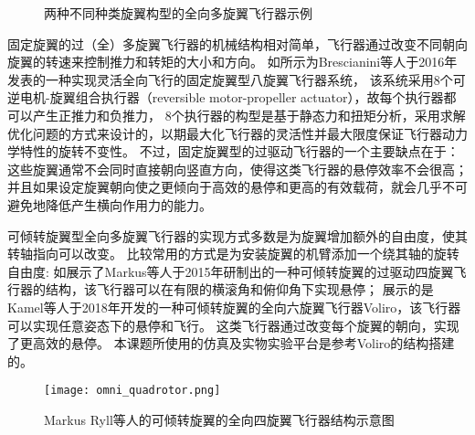 \begin{figure}[!ht]
    \setlength{\subfigcapskip}{-1bp}
    \centering
    \begin{minipage}{\textwidth}

    \centering
    \subfigure{\label{fig:omav_1}}\addtocounter{subfigure}{-2}
    \hspace{0.2em}
    \subfigure{\label{fig:omav_2}}\addtocounter{subfigure}{-2}
    
    \end{minipage}
    \caption{两种不同种类旋翼构型的全向多旋翼飞行器示例\label{fig:omav}}
\end{figure}

固定旋翼的过（全）多旋翼飞行器的机械结构相对简单，飞行器通过改变不同朝向旋翼的转速来控制推力和转矩的大小和方向。
如所示为Brescianini等人于2016年发表的一种实现灵活全向飞行的固定旋翼型八旋翼飞行器系统\cite{brescianini2016design}，
该系统采用8个可逆电机-旋翼组合执行器（reversible motor-propeller actuator），故每个执行器都可以产生正推力和负推力，
8个执行器的构型是基于静态力和扭矩分析，采用求解优化问题的方式来设计的，以期最大化飞行器的灵活性并最大限度保证飞行器动力学特性的旋转不变性。
不过，固定旋翼型的过驱动飞行器的一个主要缺点在于：这些旋翼通常不会同时直接朝向竖直方向，使得这类飞行器的悬停效率不会很高；
并且如果设定旋翼朝向使之更倾向于高效的悬停和更高的有效载荷，就会几乎不可避免地降低产生横向作用力的能力\cite{allenspach2020design}。

可倾转旋翼型全向多旋翼飞行器的实现方式多数是为旋翼增加额外的自由度，使其转轴指向可以改变。
比较常用的方式是为安装旋翼的机臂添加一个绕其轴的旋转自由度:
如展示了Markus等人于2015年研制出的一种可倾转旋翼的过驱动四旋翼飞行器的结构\cite{ryll2014novel}，该飞行器可以在有限的横滚角和俯仰角下实现悬停；
展示的是Kamel等人于2018年开发的一种可倾转旋翼的全向六旋翼飞行器Voliro\cite{kamel2018voliro}，该飞行器可以实现任意姿态下的悬停和飞行。
这类飞行器通过改变每个旋翼的朝向，实现了更高效的悬停。
本课题所使用的仿真及实物实验平台是参考Voliro的结构搭建的。

\begin{figure}[ht]
    \centering
    \texttt{[image: omni\_quadrotor.png]}
    \caption{Markus Ryll等人的可倾转旋翼的全向四旋翼飞行器结构示意图}
    \label{fig:tiltrotor_quadrotor}
\end{figure}

